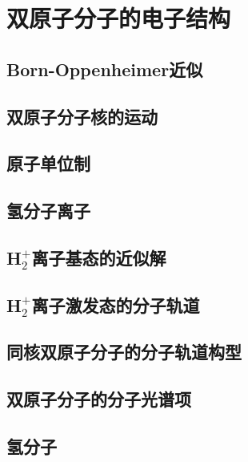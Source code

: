 \chapter{双原子分子的电子结构}
\label{chap:13}
\section{Born-Oppenheimer近似}
\label{sec:13.1 The Born-Oppenheimer Approximation}

\section{双原子分子核的运动}
\label{sec:13.2 Nuclear Motion in Diatomic Molecules}

\section{原子单位制}
\label{sec:13.3 Atomic Units}

\section{氢分子离子}
\label{sec:13.4 The Hydrogen Molecular Ion}

\section{H$_2^+$离子基态的近似解}
\label{sec:13.5 Approximate Treatments of the H$_2^+$ Ground Electronic State}

\section{H$_2^+$离子激发态的分子轨道}
\label{sec:13.6 Molecular Orbitals for H$_2^+$ Excited States}

\section{同核双原子分子的分子轨道构型}
\label{sec:13.7 MO Configurations for Homonuclear Diatomic Molecules}

\section{双原子分子的分子光谱项}
\label{sec:13.8 Electronic Terms of Diatomic Molecules}

\section{氢分子}
\label{sec:13.9 The Hydrogen Molecule}

